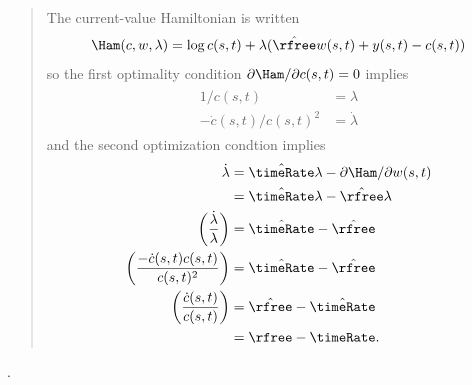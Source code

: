 \documentclass{handout}
\begin{document}
\begin{enumerate}
{\begin{quote}
The current-value Hamiltonian is written
\begin{displaymath}
        \Ham(c,w,\lambda) = \log c(s,t) + \lambda(\hat{\rfree} w(s,t) + y(s,t) - c(s,t))
\end{displaymath}
so the first optimality condition $\partial \Ham/\partial c(s,t) = 0$ implies
\begin{equation}\begin{gathered}\begin{aligned}
        1/c(s,t) & =  \lambda
\\  - \dot{c}(s,t)/c(s,t)^{2} & =  \dot{\lambda}       
\end{aligned}\end{gathered}\end{equation}
and the second optimization condtion implies
\begin{equation}\begin{gathered}\begin{aligned}
        \dot{\lambda} & =  \hat{\timeRate} \lambda - \partial \Ham/\partial w(s,t)  
\\       & =  \hat{\timeRate} \lambda - \hat{\rfree} \lambda  
\\      \left(\frac{\dot{\lambda}}{\lambda}\right) & =  \hat{\timeRate}-\hat{\rfree}
\\  \left(\frac{-\dot{c}(s,t) c(s,t)}{c(s,t)^{2}}\right) & =  \hat{\timeRate}-\hat{\rfree}
\\  \left(\frac{\dot{c}(s,t)}{c(s,t)}\right) & =  \hat{\rfree}-\hat{\timeRate} 
\\   & =  \rfree-\timeRate     .
\end{aligned}\end{gathered}\end{equation}

\end{quote}
}{\pagebreak

.
\pagebreak
}



\end{enumerate}
\end{document}
